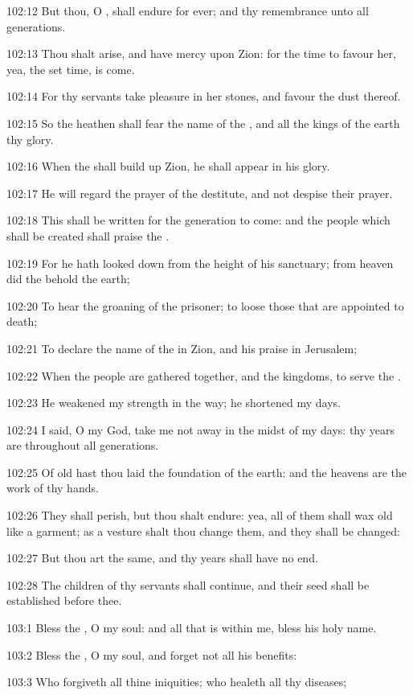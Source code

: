 102:12 But thou, O \LORD, shall endure for ever; and thy remembrance unto all generations.

102:13 Thou shalt arise, and have mercy upon Zion: for the time to favour her, yea, the set time, is come.

102:14 For thy servants take pleasure in her stones, and favour the dust thereof.

102:15 So the heathen shall fear the name of the \LORD, and all the kings of the earth thy glory.

102:16 When the \LORD shall build up Zion, he shall appear in his glory.

102:17 He will regard the prayer of the destitute, and not despise their prayer.

102:18 This shall be written for the generation to come: and the people which shall be created shall praise the \LORD.

102:19 For he hath looked down from the height of his sanctuary; from heaven did the \LORD behold the earth;

102:20 To hear the groaning of the prisoner; to loose those that are appointed to death;

102:21 To declare the name of the \LORD in Zion, and his praise in Jerusalem;

102:22 When the people are gathered together, and the kingdoms, to serve the \LORD.

102:23 He weakened my strength in the way; he shortened my days.

102:24 I said, O my God, take me not away in the midst of my days: thy years are throughout all generations.

102:25 Of old hast thou laid the foundation of the earth: and the heavens are the work of thy hands.

102:26 They shall perish, but thou shalt endure: yea, all of them shall wax old like a garment; as a vesture shalt thou change them, and they shall be changed:

102:27 But thou art the same, and thy years shall have no end.

102:28 The children of thy servants shall continue, and their seed shall be established before thee.



103:1 Bless the \LORD, O my soul: and all that is within me, bless his holy name.

103:2 Bless the \LORD, O my soul, and forget not all his benefits:

103:3 Who forgiveth all thine iniquities; who healeth all thy diseases;

